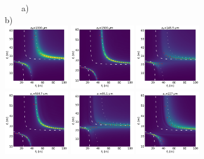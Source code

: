 \documentclass[9pt,twocolumn,twoside]{osajnl}
\begin{document}
\begin{figure}[htbp]
~~~~a)~~~~~~~~~~~~~~~~~~~~~~~~~~~~~~~~~~~~~~~~~~~~~~~~~~~~~~b) \\
\hspace{-1.1cm}
\includegraphics[width=0.25\textwidth]{figures/H_3.png}
\includegraphics[width=0.25\textwidth]{figures/V_3.png}
\includegraphics[width=0.25\textwidth]{figures/H_2.png}
\includegraphics[width=0.25\textwidth]{figures/V_2.png}
\includegraphics[width=0.25\textwidth]{figures/H_1.png}
\includegraphics[width=0.25\textwidth]{figures/V_1.png}

\end{figure}
\end{document}

